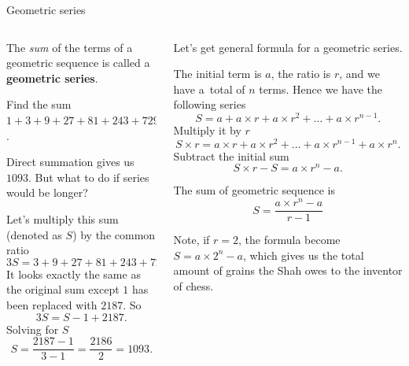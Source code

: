 \documentclass[9pt,aspectratio=169]{beamer}
\begin{document}
\begin{frame}{Geometric series}
  \begin{columns}[T]
    \begin{column}{0.5\textwidth}
      \begin{definition}
        The \emph{sum} of the terms of a geometric sequence is called a \textbf{geometric series}.
      \end{definition}
      \begin{problem}
        Find the sum $1 + 3 + 9 + 27 + 81 + 243 + 729$.
      \end{problem}

      Direct summation gives us $1093$. But what to do if series would be longer?

      Let’s multiply this sum (denoted as $S$) by the common ratio
      \[ 3S = 3 + 9 + 27 + 81 + 243 + 729 + 2187. \]
      It looks exactly the same as the original sum except $1$ has been replaced with $2187$.  So 
      \[ 3S = S - 1 + 2187. \]
      Solving for $S$
      \[ S = \frac{2187 - 1}{3 - 1} = \frac{2186}{2} = 1093. \]
    \end{column}
    \begin{column}{0.5\textwidth}
      Let’s get general formula for a geometric series.
      
      The initial term is $a$, the ratio is $r$, and we have a~total of $n$ terms. Hence we have the following series
      \[ S = a + a \times r + a \times r^2 + \ldots + a \times r^{n-1}. \]Multiply it by $r$
      \[ S \times r = a \times r + a \times r^2 + \ldots + a \times r^{n-1} + a \times r^n. \]
      Subtract the initial sum
      \[ S \times r - S = a \times r^n - a. \]
      \vspace*{-1em}
      \begin{definition}
        The sum of geometric sequence is
        \[ S = \frac{a \times r^n - a}{r - 1}\]
        \vspace*{-0.7em}
      \end{definition}
      Note, if $r = 2$, the formula become $S = a \times 2^n - a$, which gives us the total amount of grains the Shah owes to the inventor of chess.
    \end{column}
  \end{columns}
\end{frame}
\end{document}
